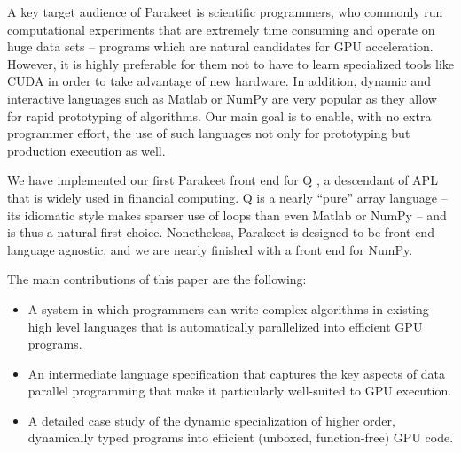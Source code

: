 \documentclass[preprint]{sigplanconf}
\begin{document}
A key target audience of Parakeet is scientific programmers, who commonly run computational experiments that are extremely time consuming and operate on huge data sets -- programs which are natural candidates for GPU acceleration. However, it is highly preferable for them not to have to learn specialized tools like CUDA in order to take advantage of new hardware.  In addition, dynamic and interactive languages such as Matlab or NumPy are very popular as they allow for rapid prototyping of algorithms.  Our main goal is to enable, with no extra programmer effort, the use of such languages not only for prototyping but production execution as well.

We have implemented our first Parakeet front end for Q \cite{Borr08}, a descendant of APL that is widely used in financial computing. Q is a nearly ``pure'' array language -- its idiomatic style makes sparser use of loops than even Matlab or NumPy -- and is thus a natural first choice. Nonetheless, Parakeet is designed to be front end language agnostic, and we are nearly finished with a front end for NumPy.

The main contributions of this paper are the following:

\begin{itemize}
\item A system in which programmers can write complex algorithms in existing high level languages that is automatically parallelized into efficient GPU programs.

\item An intermediate language specification that captures the key aspects of data parallel programming that make it particularly well-suited to GPU execution.

\item A detailed case study of the dynamic specialization of higher order, dynamically typed programs into efficient (unboxed, function-free) GPU code.
\end{itemize}
\end{document}
